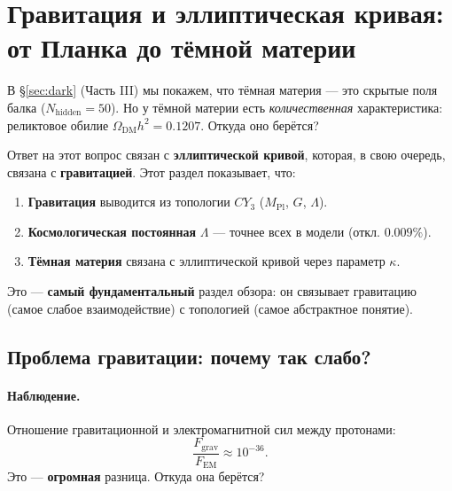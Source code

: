 \documentclass[11pt,a4paper]{article}
\newcommand{\CY}{CY_3}
\newcommand{\Nhidden}{N_{\text{hidden}}}
\newcommand{\Mpl}{M_{\text{Pl}}}
\theoremstyle{definition}
\begin{document}
\section{Гравитация и эллиптическая кривая: от Планка до тёмной материи}
\label{sec:gravity}

В §\ref{sec:dark} (Часть III) мы покажем, что тёмная материя — 
это скрытые поля балка ($\Nhidden = 50$). Но у тёмной материи 
есть \emph{количественная} характеристика: реликтовое обилие 
$\Omega_{\text{DM}} h^2 = 0.1207$. Откуда оно берётся?

Ответ на этот вопрос связан с \textbf{эллиптической кривой}, 
которая, в свою очередь, связана с \textbf{гравитацией}. 
Этот раздел показывает, что:

\begin{enumerate}
    \item \textbf{Гравитация} выводится из топологии $\CY$ 
          ($\Mpl$, $G$, $\Lambda$).
    \item \textbf{Космологическая постоянная} $\Lambda$ — точнее 
          всех в модели (откл. $0.009\%$).
    \item \textbf{Тёмная материя} связана с эллиптической кривой 
          через параметр $\kappa$.
\end{enumerate}

Это — \textbf{самый фундаментальный} раздел обзора: он связывает 
гравитацию (самое слабое взаимодействие) с топологией 
(самое абстрактное понятие).

\subsection{Проблема гравитации: почему так слабо?}
\label{subsec:gravity-problem}

\paragraph{Наблюдение.}
Отношение гравитационной и электромагнитной сил между 
протонами:
\begin{equation}
    \frac{F_{\text{grav}}}{F_{\text{EM}}} 
    \approx 10^{-36}.
\end{equation}
Это — \textbf{огромная} разница. Откуда она берётся?
\end{document}
